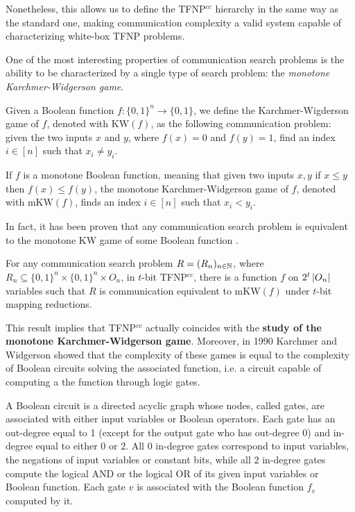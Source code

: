 Nonetheless, this allows us to define the \textsf{TFNP}$^{cc}$ hierarchy in the same way as the standard one, making communication complexity a valid system capable of characterizing white-box \textsf{TFNP problems}.

One of the most interesting properties of communication search problems is the ability to be characterized by a single type of search problem: the \textit{monotone Karchmer-Widgerson game}.

\begin{definition}
    Given a Boolean function $f : \{0, 1\}^n \to \{0, 1\}$, we define the Karchmer-Wigderson game of $f$, denoted with $\mathrm{KW}(f)$, as the following communication problem: given the two inputs $x$ and $y$, where $f(x) = 0$ and $f(y) = 1$, find an index  $i \in [n]$ such that $x_i \neq y_i$.

    If $f$ is a monotone Boolean function, meaning that given two inputs $x,y$ if $x \leq y$ then $f(x) \leq f(y)$, the monotone Karchmer-Widgerson game of $f$, denoted with $\mathrm{mKW}(f)$, finds an index $i \in [n]$ such that $x_i < y_i$.
\end{definition}

In fact, it has been proven  that any communication search problem is equivalent to the monotone KW game of some Boolean function \cite{span_programs,adventures_monotone_tfnp}.

\begin{lemma}
    For any communication search problem $R = (R_n)_{n \in \mathbb{N}}$, where $R_n \subseteq \{0,1\}^n \times \{0,1\}^n \times O_n$, in $t$-bit \textsf{TFNP}$^{cc}$, there is a function $f$ on $2^t\left|O_n\right|$ variables such that $R$ is communication equivalent to $\mathrm{mKW}(f)$ under $t$-bit mapping reductions.
\end{lemma}

This result implies that \textsf{TFNP}$^{cc}$ actually coincides with the \textbf{study of the monotone Karchmer-Widgerson game}. Moreover, in 1990 Karchmer and Widgerson \cite{kw_games} showed that the complexity of these games is equal to the complexity of Boolean circuits solving the associated function, i.e. a circuit capable of computing a the function through logic gates.

\begin{definition}
    A Boolean circuit is a directed acyclic graph whose nodes, called gates, are associated with either input variables or Boolean operators. Each gate has an out-degree equal to 1 (except for the output gate who has out-degree 0) and in-degree equal to either 0 or 2. All 0 in-degree gates correspond to input variables, the negations of input variables or constant bits, while all 2 in-degree gates compute the logical AND or the logical OR of its given input variables or Boolean function. Each gate $v$ is associated with the Boolean function $f_v$ computed by it.
\end{definition}

